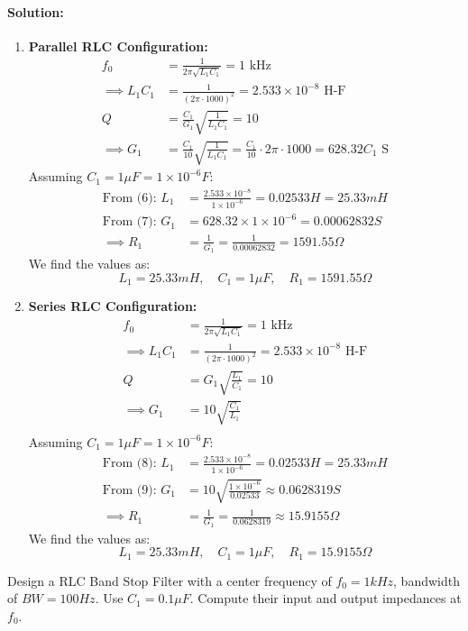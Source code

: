 \paragraph{Solution:}
\begin{enumerate}
  \item \textbf{Parallel RLC Configuration:}
    \begin{align*}
      f_0 &= \frac{1}{2\pi \sqrt{L_1 C_1}} = 1 \text{ kHz} \\
      \implies L_1 C_1 &= \frac{1}{(2\pi \cdot 1000)^2} = 2.533 \times 10^{-8} \text{ H-F} \tag{6} \\
      Q &= \frac{C_1}{G_1} \sqrt{\frac{1}{L_1 C_1}} = 10 \\
      \implies G_1 &= \frac{C_1}{10} \sqrt{\frac{1}{L_1 C_1}} = \frac{C_1}{10} \cdot 2\pi \cdot 1000 = 628.32 C_1 \text{ S} \tag{7}
    \end{align*}
    Assuming \(C_1 = 1 \mu F = 1 \times 10^{-6} F\):
    \begin{align*}
      \text{From (6): } L_1 &= \frac{2.533 \times 10^{-8}}{1 \times 10^{-6}} = 0.02533 H = 25.33 mH \\
      \text{From (7): } G_1 &= 628.32 \times 1 \times 10^{-6} = 0.00062832 S \\
      \implies R_1 &= \frac{1}{G_1} = \frac{1}{0.00062832} = 1591.55 \Omega
    \end{align*}
    We find the values as:
    \[
      L_1 = 25.33 mH, \quad C_1 = 1 \mu F, \quad R_1 = 1591.55 \Omega
    \]
  \item \textbf{Series RLC Configuration:}
    \begin{align*}
      f_0 &= \frac{1}{2\pi \sqrt{L_1 C_1}} = 1 \text{ kHz} \\
      \implies L_1 C_1 &= \frac{1}{(2\pi \cdot 1000)^2} = 2.533 \times 10^{-8} \text{ H-F} \tag{8} \\
      Q &= G_1 \sqrt{\frac{L_1}{C_1}} = 10 \\
      \implies G_1 &= 10 \sqrt{\frac{C_1}{L_1}} \tag{9} \\
    \end{align*}
    Assuming \(C_1 = 1 \mu F = 1 \times 10^{-6} F\):
    \begin{align*}
      \text{From (8): } L_1 &= \frac{2.533 \times 10^{-8}}{1 \times 10^{-6}} = 0.02533 H = 25.33 mH \\
      \text{From (9): } G_1 &= 10 \sqrt{\frac{1 \times 10^{-6}}{0.02533}} \approx 0.0628319 S \\
      \implies R_1 &= \frac{1}{G_1} = \frac{1}{0.0628319} \approx 15.9155 \Omega
    \end{align*}
    We find the values as:
    \[
      L_1 = 25.33 mH, \quad C_1 = 1 \mu F, \quad R_1 = 15.9155 \Omega
    \]
\end{enumerate}
Design a RLC Band Stop Filter with a center frequency of
\(f_0 = 1kHz\), bandwidth of \(BW = 100Hz\). Use \(C_1 = 0.1\mu F\).
Compute their input and output impedances at \(f_0\).
